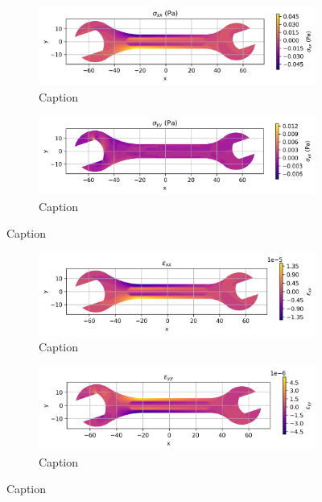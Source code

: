 \documentclass{article}  %
\begin{document}
\begin{figure}[H]
  \centering
  \begin{subfigure}[t]{0.49\textwidth}
    \centering
    \includegraphics[width=\textwidth]{GRAFICOS/Case d - sigma_xx.png}
    \caption{Caption}
    \label{fig:deformada_reacciones}
  \end{subfigure}
  \hfill
  \begin{subfigure}[t]{0.49\textwidth}
    \centering
    \includegraphics[width=\textwidth]{GRAFICOS/Case d - sigma_yy.png}
    \caption{Caption}
    \label{fig:von_mises}
  \end{subfigure}
  \caption{Caption}
  \label{fig:analisis_estructural}
\end{figure}

\begin{figure}[H]
  \centering
  \begin{subfigure}[t]{0.49\textwidth}
    \centering
    \includegraphics[width=\textwidth]{GRAFICOS/Case d - epsilon_xx.png}
    \caption{Caption}
    \label{fig:deformada_reacciones}
  \end{subfigure}
  \hfill
  \begin{subfigure}[t]{0.49\textwidth}
    \centering
    \includegraphics[width=\textwidth]{GRAFICOS/Case d - epsilon_yy.png}
    \caption{Caption}
    \label{fig:von_mises}
  \end{subfigure}
  \caption{Caption}
  \label{fig:analisis_estructural}
\end{figure}
\end{document}
